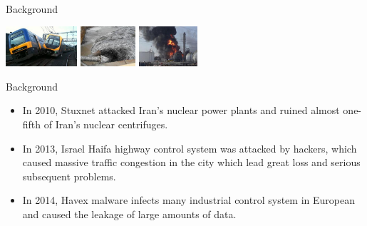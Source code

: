 \documentclass[10pt, compress]{beamer}
\begin{document}
\begin{frame}{Background}
\begin{center}
\begin{minipage}[m]{0.9\textwidth}
        \includegraphics[height=1.5cm]{Figures/Introduction/Fig7.png} \hfill
        \includegraphics[height=1.5cm]{Figures/Introduction/Fig8.png} \hfill
        \includegraphics[height=1.5cm]{Figures/Introduction/Fig9.png}
      \end{minipage}
    \end{center}
\end{frame}

\begin{frame}{Background}
    \begin{itemize}
      \item In 2010, Stuxnet attacked Iran's nuclear power plants and ruined almost one-fifth of Iran's nuclear centrifuges.
      \item In 2013, Israel Haifa highway control system  was attacked by hackers, which caused massive traffic congestion in the city which lead great loss and serious subsequent problems.
      \item In 2014, Havex malware infects many industrial control system in European  and caused the leakage of large amounts of data.
    \end{itemize}
    
    \begin{minipage}[c][][t]{0.6\textwidth}
      
    \end{minipage}    
    \begin{minipage}[c][][t]{0.35\textwidth}
    \end{minipage}
\end{frame}
\end{document}
